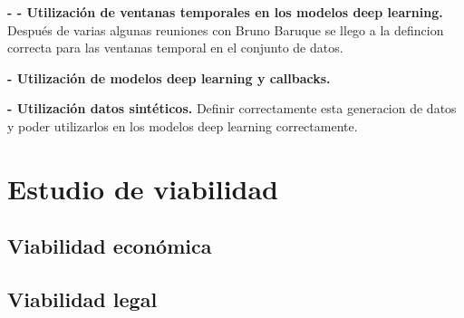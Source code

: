 \textbf{- - Utilización de ventanas temporales en los modelos deep learning.} Después de varias algunas reuniones con Bruno Baruque se llego a la defincion correcta para las ventanas temporal en el conjunto de datos.

\textbf{- Utilización de modelos deep learning y callbacks.}

\textbf{- Utilización datos sintéticos.} Definir correctamente esta generacion de datos y poder utilizarlos en los modelos deep learning correctamente.




\section{Estudio de viabilidad}




\subsection{Viabilidad económica}

\subsection{Viabilidad legal}


